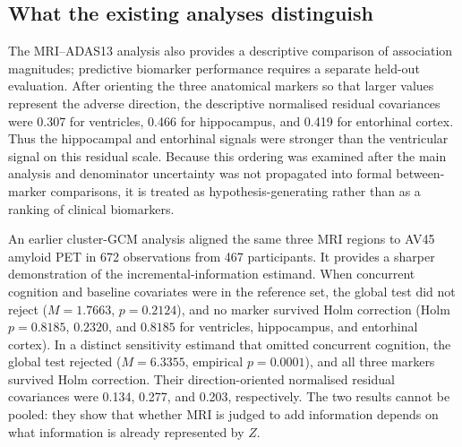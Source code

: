 \documentclass[11pt]{article}
\theoremstyle{definition}
\begin{document}
\subsection{What the existing analyses distinguish}

The MRI--ADAS13 analysis also provides a descriptive comparison of association magnitudes;
predictive biomarker performance requires a separate held-out evaluation. After orienting the three anatomical markers
so that larger values represent the adverse direction, the descriptive normalised residual
covariances were 0.307 for ventricles, 0.466 for hippocampus, and 0.419 for entorhinal
cortex. Thus the hippocampal and entorhinal signals were stronger than the ventricular
signal on this residual scale. Because this ordering was examined after the main analysis
and denominator uncertainty was not propagated into formal between-marker comparisons, it
is treated as hypothesis-generating rather than as a ranking of clinical biomarkers.

An earlier cluster-GCM analysis aligned the same three MRI regions to AV45 amyloid PET in
672 observations from 467 participants. It provides a sharper demonstration of the
incremental-information estimand. When concurrent cognition and baseline covariates were in
the reference set, the global test did not reject ($M=1.7663$, $p=0.2124$), and no
marker survived Holm correction (Holm $p=0.8185$, $0.2320$, and $0.8185$ for ventricles,
hippocampus, and entorhinal cortex). In a distinct sensitivity estimand that omitted concurrent
cognition, the global test rejected ($M=6.3355$, empirical $p=0.0001$), and all three
markers survived Holm correction. Their direction-oriented normalised residual covariances
were 0.134, 0.277, and 0.203, respectively. The two results cannot be pooled: they show that
whether MRI is judged to add information depends on what information is already represented
by $Z$.
\end{document}
